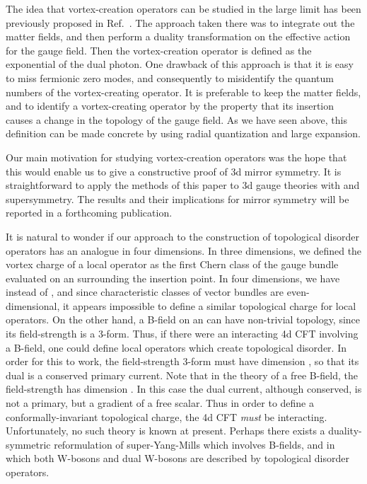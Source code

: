 \documentclass[a4paper,12pt, amsfonts, amssymb]{article}
\begin{document}
The idea that vortex-creation operators can be studied in the large \coordHE{}
limit has been previously proposed in Ref.~\cite{KS}. The approach taken there
was to integrate out the matter fields, and then perform a duality
transformation on the effective action for the gauge field. Then the vortex-creation operator is defined as the exponential of the dual photon. 
One drawback of this approach is that it is easy to miss fermionic
zero modes, and consequently to misidentify the quantum numbers of the
vortex-creating operator. It is preferable to keep the matter fields,
and to identify a vortex-creating operator by the property that its insertion
causes a change in the topology of the gauge field. As we have seen above,
this definition can be made concrete by using radial quantization and
large \coordHE{} expansion.

Our main motivation for studying vortex-creation operators was the hope
that this would enable us to give a constructive proof of 3d mirror
symmetry. It is straightforward to apply the methods of this paper
to 3d gauge theories with \coordHE{} and \coordHE{} supersymmetry.
The results and their implications for mirror symmetry will be reported
in a forthcoming publication.

It is natural to wonder if our approach to the construction of 
topological disorder operators has an analogue in four dimensions. In three
dimensions, we defined the vortex charge of a local operator as the first
Chern class of the gauge bundle evaluated on an \coordHE{} surrounding the
insertion point. In four dimensions, we have \coordHE{} instead of 
\coordHE{}, and since characteristic classes of vector bundles are even-dimensional, it appears impossible to define a similar topological charge for local operators. On the other hand, a B-field on an \coordHE{}
can have non-trivial topology, since its field-strength is a 3-form.
Thus, if there were an interacting 4d CFT involving a B-field, one could
define local operators which create topological disorder. In order for this to work, the field-strength 3-form must have dimension \coordHE{}, so that its
dual is a conserved primary current. Note that in the theory of a free
B-field, the field-strength has dimension \coordHE{}. In this case the dual current, although conserved, is not a primary, but a gradient of a free scalar. 
Thus in order to define a conformally-invariant
topological charge, the 4d CFT {\it must} be interacting. Unfortunately,
no such theory is known at present. Perhaps there exists a duality-symmetric 
reformulation of \coordHE{}  \coordHE{} super-Yang-Mills which involves B-fields,
and in which both W-bosons and dual W-bosons are described by 
topological disorder operators.
\end{document}

